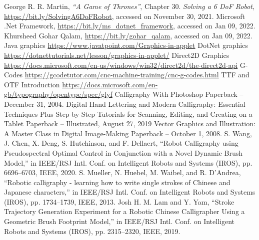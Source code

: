 \begin{thebibliography}{99}
 George R. R. Martin, \emph{``A Game of Thrones''}, Chapter $30$.
 \emph{Solving a 6 DoF Robot}, \url{https://bit.ly/SolvingA6DoFRobot}, accessed on November 30, 2021.
 Microsoft .Net Framework, \url{https://bit.ly/ms_dotnet_framework}, accessed on Jan 09, 2022.
 Khursheed Gohar Qalam, \url{https://bit.ly/gohar_qalam}, accessed on Jan 09, 2022.
 Java graphics \url{https://www.javatpoint.com/Graphics-in-applet}
 DotNet graphics \url{https://dotnettutorials.net/lesson/graphics-in-applet/}
 Direct2D Graphics \url{https://docs.microsoft.com/en-us/windows/win32/direct2d/the-direct2d-api}
 G-Codes \url{https://gcodetutor.com/cnc-machine-training/cnc-g-codes.html}
 TTF and OTF Introduction \url{https://docs.microsoft.com/en-gb/typography/opentype/spec/glyf}
 Calligraphy With Photoshop Paperback – December 31, 2004.
 Digital Hand Lettering and Modern Calligraphy: Essential Techniques Plus Step-by-Step Tutorials for Scanning, Editing, and Creating on a Tablet Paperback – Illustrated, August 27, 2019
 Vector Graphics and Illustration: A Master Class in Digital Image-Making Paperback – October 1, 2008.
 S. Wang, J. Chen, X. Deng, S. Hutchinson, and F. Dellaert, ``Robot Calligraphy using Pseudospectral Optimal Control in Conjunction with a Novel Dynamic Brush Model,'' in IEEE/RSJ Intl. Conf. on Intelligent Robots and Systems (IROS), pp. 6696–6703, IEEE, 2020.
 S. Mueller, N. Huebel, M. Waibel, and R. D’Andrea, ``Robotic calligraphy - learning how to write single strokes of Chinese and Japanese characters,'' in IEEE/RSJ Intl. Conf. on Intelligent Robots and Systems (IROS), pp. 1734–1739, IEEE, 2013.
 Josh H. M. Lam and Y. Yam, ``Stroke Trajectory Generation Experiment for a Robotic Chinese Calligrapher Using a Geometric Brush Footprint Model,'' in IEEE/RSJ Intl. Conf. on Intelligent Robots and Systems (IROS), pp. 2315–2320, IEEE, 2019.
\end{thebibliography} 